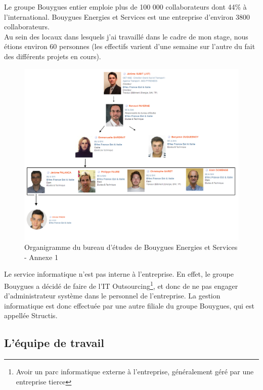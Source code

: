\documentclass[a4paper]{article}
\begin{document}
    Le groupe Bouygues entier emploie plus de 100 000 collaborateurs dont 44\% à l’international. Bouygues Energies et Services est une entreprise d'environ 3800 collaborateurs. \\

    Au sein des locaux dans lesquels j'ai travaillé dans le cadre de mon stage, nous étions environ 60 personnes (les effectifs varient d'une semaine sur l'autre du fait des différents projets en cours).  \\

    \begin{figure}[H]
        \centering
        \includegraphics[scale=0.45]{img/Organigramme}
        \caption{Organigramme du bureau d'études de Bouygues Energies et Services - Annexe 1}
    \end{figure}

    Le service informatique n'est pas interne à l'entreprise. En effet, le groupe Bouygues a décidé de faire de l'IT Outsourcing\footnote{Avoir un parc informatique externe à l'entreprise, généralement géré par une entreprise tierce}, et donc de ne pas engager d'administrateur système dans le personnel de l'entreprise. La gestion informatique est donc effectuée par une autre filiale du groupe Bouygues, qui est appellée Structis. \\

    \subsection{L'équipe de travail}
\end{document}
